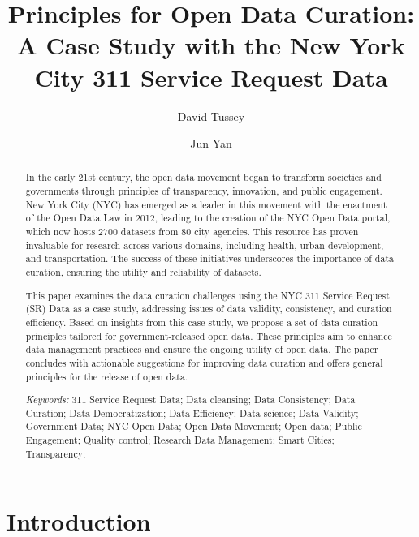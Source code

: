 \documentclass[12pt, titlepage]{article}
\title{Principles for Open Data Curation: A Case Study with the New
  York City 311 Service Request Data}
\author[1]{David Tussey}
\author[2]{Jun Yan}
\affil[1]{Former Executive Director, NYC DoITT}
\affil[2]{Department of Statistics, University of Connecticut}
\begin{document}
\maketitle

\tableofcontents %
\listoffigures %
\listoftables %


\begin{abstract}
  In the early 21st century, the open data movement began to transform societies 
  and governments through principles of transparency, innovation, and 
  public engagement. New York City (NYC) has emerged as a leader in this 
  movement with the enactment of the Open Data Law in 2012, 
  leading to the creation of the NYC Open Data portal, which now hosts 
  2700 datasets from 80 city agencies. This resource has proven invaluable 
  for research across various domains, including health, 
  urban development, and transportation. The success of these initiatives 
  underscores the importance of data curation, ensuring 
  the utility and reliability of datasets. 

This paper examines the data curation challenges using the 
NYC 311 Service Request (SR) Data as a case study, addressing issues 
of data validity, consistency, and curation efficiency. Based on 
insights from this case study, we propose a set of data curation 
principles tailored for government-released open data. These principles 
aim to enhance data management practices and ensure 
the ongoing utility of open data. The paper concludes with 
actionable suggestions for improving data curation and offers 
general principles for the release of open data.

\bigskip
  
\noindent
\textit{Keywords:}
311 Service Request Data;
Data cleansing;
Data Consistency;
Data Curation;
Data Democratization;
Data Efficiency;
Data science;
Data Validity;
Government Data;
NYC Open Data;
Open Data Movement;
Open data;
Public Engagement;
Quality control;
Research Data Management;
Smart Cities;
Transparency;
\end{abstract}

\doublespacing

\section{Introduction} \label{sec:intro}
\end{document}
